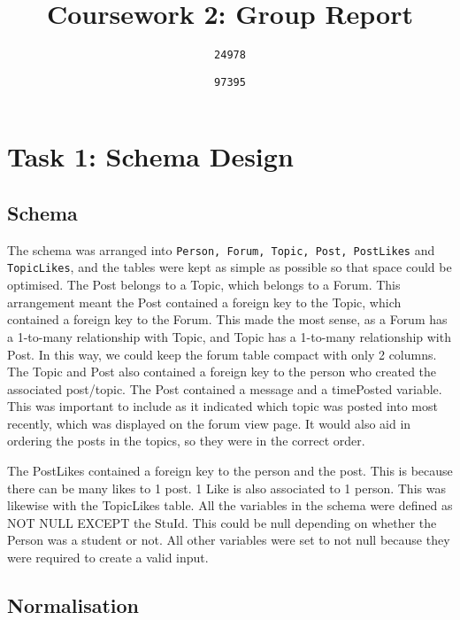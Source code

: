 \documentclass{article}
\begin{document}
\author{
	\texttt{24978}
	\and
	\texttt{97395}
}
\title{Coursework 2: Group Report}
\maketitle

\section*{Task 1: Schema Design}

\subsection*{Schema}

The schema was arranged into \texttt{Person, Forum, Topic, Post, PostLikes} and \texttt{TopicLikes}, and the tables were kept as simple as possible so that space could be optimised.
The Post belongs to a Topic, which belongs to a Forum. This arrangement meant the Post contained a foreign key to the Topic, which contained a foreign key to the Forum. This made the most sense, as a Forum has a 1-to-many relationship with Topic, and Topic has a 1-to-many relationship with Post. In this way, we could keep the forum table compact with only 2 columns.
The Topic and Post also contained a foreign key to the person who created the associated post/topic.
The Post contained a message and a timePosted variable. This was important to include as it indicated which topic was posted into most recently, which was displayed on the forum view page. It would also aid in ordering the posts in the topics, so they were in the correct order.

The PostLikes contained a foreign key to the person and the post. This is because there can be many likes to 1 post. 1 Like is also associated to 1 person.
This was likewise with the TopicLikes table.
All the variables in the schema were defined as NOT NULL EXCEPT the StuId. This could be null depending on whether the Person was a student or not. All other variables were set to not null because they were required to create a valid input.


\subsection*{Normalisation}
\end{document}
